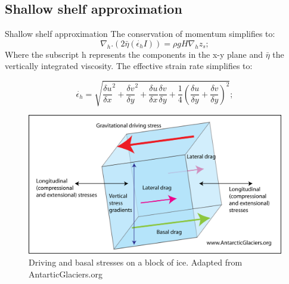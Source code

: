 \documentclass[11pt]{beamer}
\begin{document}
	\subsection{Shallow shelf approximation}
		\begin{frame}{Shallow shelf approximation}
			\justifying
			The conservation of momentum simplifies to:
			\begin{equation}
				\nabla_h.(2\bar{\eta}(\dot{\epsilon_h}I))=\rho g H \nabla_h z_s;
			\end{equation}
			Where the subscript h represents the components in the x-y plane and $\bar{\eta}$ the vertically integrated viscosity. The effective strain rate simplifies to:
			
			\begin{equation}
				\dot{\epsilon_h}=\sqrt{{\frac{\delta u}{\delta x}}^2+{\frac{\delta v}{\delta y}}^2+\frac{\delta u}{\delta x}\frac{\delta v}{\delta y}+\frac{1}{4}{(\frac{\delta u}{\delta y}+\frac{\delta v}{\delta y})}^2};
			\end{equation}
			\begin{figure}
				\centering
				\includegraphics[scale=0.25]{../fig/nine-stresses.png}
				\caption{Driving and basal stresses on a block of ice. Adapted from AntarticGlaciers.org}
				\label{nine_stresses}
			\end{figure}
		\end{frame}
			
		
\end{document}
